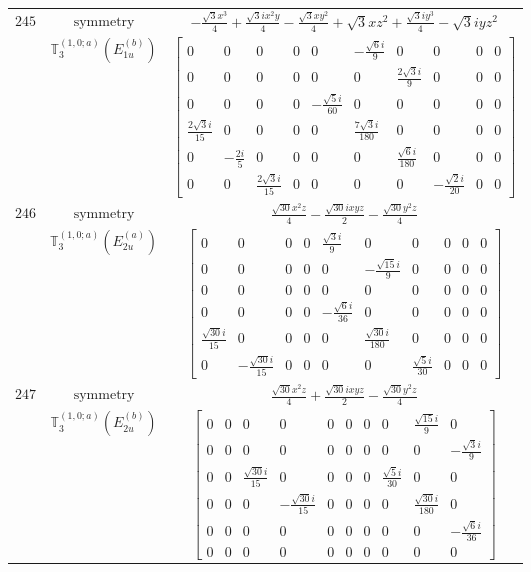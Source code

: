 \documentclass[fleqn,8pt,landscape]{jsarticle}
\begin{document}
\begin{longtable}{ccc}
$ 245 $ & $ \text{symmetry} $ & $ - \frac{\sqrt{3} x^{3}}{4} + \frac{\sqrt{3} i x^{2} y}{4} - \frac{\sqrt{3} x y^{2}}{4} + \sqrt{3} x z^{2} + \frac{\sqrt{3} i y^{3}}{4} - \sqrt{3} i y z^{2} $ \\
$  $ & $ \mathbb{T}_{3}^{(1,0;a)}(E_{1u}^{(b)}) $ & $ \begin{bmatrix} 0 & 0 & 0 & 0 & 0 & - \frac{\sqrt{6} i}{9} & 0 & 0 & 0 & 0 \\ 0 & 0 & 0 & 0 & 0 & 0 & \frac{2 \sqrt{3} i}{9} & 0 & 0 & 0 \\ 0 & 0 & 0 & 0 & - \frac{\sqrt{5} i}{60} & 0 & 0 & 0 & 0 & 0 \\ \frac{2 \sqrt{3} i}{15} & 0 & 0 & 0 & 0 & \frac{7 \sqrt{3} i}{180} & 0 & 0 & 0 & 0 \\ 0 & - \frac{2 i}{5} & 0 & 0 & 0 & 0 & \frac{\sqrt{6} i}{180} & 0 & 0 & 0 \\ 0 & 0 & \frac{2 \sqrt{3} i}{15} & 0 & 0 & 0 & 0 & - \frac{\sqrt{2} i}{20} & 0 & 0 \end{bmatrix} $ \\ \hline
$ 246 $ & $ \text{symmetry} $ & $ \frac{\sqrt{30} x^{2} z}{4} - \frac{\sqrt{30} i x y z}{2} - \frac{\sqrt{30} y^{2} z}{4} $ \\
$  $ & $ \mathbb{T}_{3}^{(1,0;a)}(E_{2u}^{(a)}) $ & $ \begin{bmatrix} 0 & 0 & 0 & 0 & \frac{\sqrt{3} i}{9} & 0 & 0 & 0 & 0 & 0 \\ 0 & 0 & 0 & 0 & 0 & - \frac{\sqrt{15} i}{9} & 0 & 0 & 0 & 0 \\ 0 & 0 & 0 & 0 & 0 & 0 & 0 & 0 & 0 & 0 \\ 0 & 0 & 0 & 0 & - \frac{\sqrt{6} i}{36} & 0 & 0 & 0 & 0 & 0 \\ \frac{\sqrt{30} i}{15} & 0 & 0 & 0 & 0 & \frac{\sqrt{30} i}{180} & 0 & 0 & 0 & 0 \\ 0 & - \frac{\sqrt{30} i}{15} & 0 & 0 & 0 & 0 & \frac{\sqrt{5} i}{30} & 0 & 0 & 0 \end{bmatrix} $ \\ \hline
$ 247 $ & $ \text{symmetry} $ & $ \frac{\sqrt{30} x^{2} z}{4} + \frac{\sqrt{30} i x y z}{2} - \frac{\sqrt{30} y^{2} z}{4} $ \\
$  $ & $ \mathbb{T}_{3}^{(1,0;a)}(E_{2u}^{(b)}) $ & $ \begin{bmatrix} 0 & 0 & 0 & 0 & 0 & 0 & 0 & 0 & \frac{\sqrt{15} i}{9} & 0 \\ 0 & 0 & 0 & 0 & 0 & 0 & 0 & 0 & 0 & - \frac{\sqrt{3} i}{9} \\ 0 & 0 & \frac{\sqrt{30} i}{15} & 0 & 0 & 0 & 0 & \frac{\sqrt{5} i}{30} & 0 & 0 \\ 0 & 0 & 0 & - \frac{\sqrt{30} i}{15} & 0 & 0 & 0 & 0 & \frac{\sqrt{30} i}{180} & 0 \\ 0 & 0 & 0 & 0 & 0 & 0 & 0 & 0 & 0 & - \frac{\sqrt{6} i}{36} \\ 0 & 0 & 0 & 0 & 0 & 0 & 0 & 0 & 0 & 0 \end{bmatrix} $ \\ \hline

\end{longtable}
\end{document}

